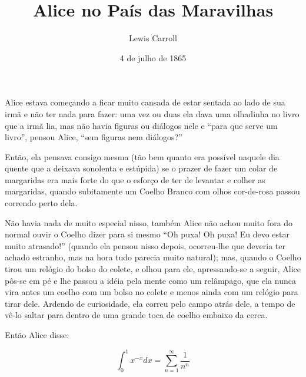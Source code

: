\documentclass[12pt, a4paper]{article}
\title{Alice no País das Maravilhas}
\author{Lewis Carroll}
\date{4 de julho de 1865}
\begin{document}
  \maketitle

  Alice estava começando a ficar muito cansada de estar sentada ao lado de sua irmã e não ter nada para fazer: uma vez ou duas ela dava uma olhadinha no livro que a irmã lia, mas não havia figuras ou diálogos nele e “para que serve um livro”, pensou Alice, “sem figuras nem diálogos?”

  Então, ela pensava consigo mesma (tão bem quanto era possível naquele dia quente que a deixava sonolenta e estúpida) se o prazer de fazer um colar de margaridas era mais forte do que o esforço de ter de levantar e colher as margaridas, quando subitamente um Coelho Branco com olhos cor-de-rosa passou correndo perto dela.

  Não havia nada de muito especial nisso, também Alice não achou muito fora do normal ouvir o Coelho dizer para si mesmo “Oh puxa! Oh puxa! Eu devo estar muito atrasado!” (quando ela pensou nisso depois, ocorreu-lhe que deveria ter achado estranho, mas na hora tudo parecia muito natural); mas, quando o Coelho tirou um relógio do bolso do colete, e olhou para ele, apressando-se a seguir, Alice pôs-se em pé e lhe passou a idéia pela mente como um relâmpago, que ela nunca vira antes um coelho com um bolso no colete e menos ainda com um relógio para tirar dele. Ardendo de curiosidade, ela correu pelo campo atrás dele, a tempo de vê-lo saltar para dentro de uma grande toca de coelho embaixo da cerca.

  Então Alice disse:

  \[
    \int_0^1 x^{-x} dx = \sum_{n=1}^\infty \frac{1}{n^n}
  \]
\end{document}
